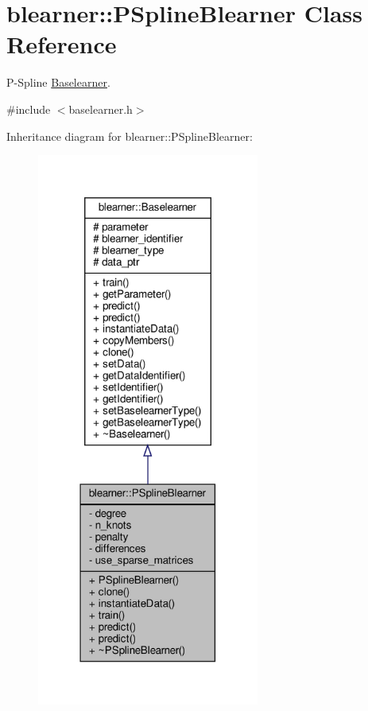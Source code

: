 \hypertarget{classblearner_1_1_p_spline_blearner}{}\section{blearner\+:\+:P\+Spline\+Blearner Class Reference}
\label{classblearner_1_1_p_spline_blearner}


P-\/\+Spline \mbox{\hyperlink{classblearner_1_1_baselearner}{Baselearner}}.  




{\ttfamily \#include $<$baselearner.\+h$>$}



Inheritance diagram for blearner\+:\+:P\+Spline\+Blearner\+:\nopagebreak
\begin{figure}[H]
\begin{center}
\leavevmode
\includegraphics[width=207pt]{classblearner_1_1_p_spline_blearner__inherit__graph}
\end{center}
\end{figure}


